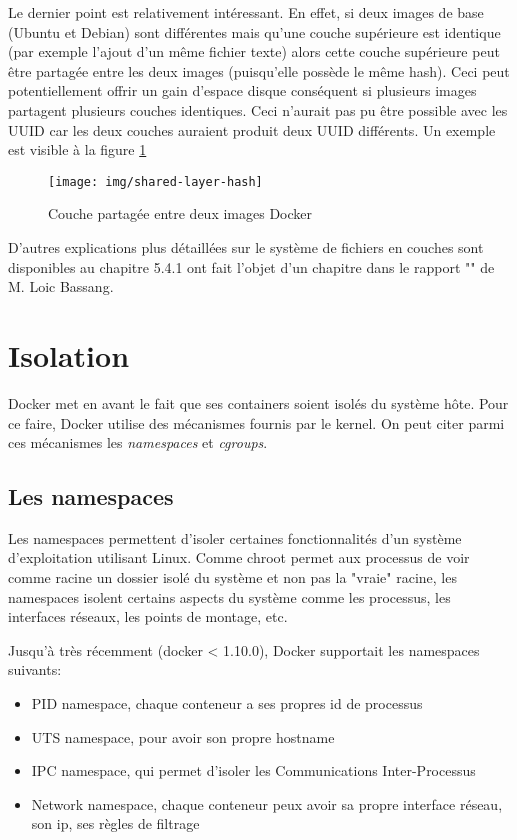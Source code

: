 Le dernier point est relativement intéressant. En effet, si deux images de base (Ubuntu et Debian) sont différentes mais qu'une couche supérieure est identique (par exemple l'ajout d'un même fichier texte) alors cette couche supérieure peut être partagée entre les deux images (puisqu'elle possède le même hash). Ceci peut potentiellement offrir un gain d'espace disque conséquent si plusieurs images partagent plusieurs couches identiques. Ceci n'aurait pas pu être possible avec les UUID car les deux couches auraient produit deux UUID différents. Un exemple est visible à la figure \ref{shared-layer-hash}

\begin{figure}[hbtp]
\centering
\texttt{[image: img/shared-layer-hash]}
\caption{Couche partagée entre deux images Docker}
\label{shared-layer-hash}
\end{figure}

D'autres explications plus détaillées sur le système de fichiers en couches sont disponibles au chapitre 5.4.1 ont fait l'objet d'un chapitre dans le rapport "\bassangPrjSemestre" de M. Loic Bassang.


\section{Isolation}\label{pres-docker-isolation}
Docker met en avant le fait que ses containers soient isolés du système hôte. Pour ce faire, Docker utilise des mécanismes fournis par le kernel. On peut citer parmi ces mécanismes les \textit{namespaces} et \textit{cgroups}.

\subsection{Les namespaces}
Les namespaces permettent d'isoler certaines fonctionnalités d'un système d'exploitation utilisant Linux. Comme chroot permet aux processus de voir comme racine un dossier isolé du système et non pas la "vraie" racine, les namespaces isolent certains aspects du système comme les processus, les interfaces réseaux, les points de montage, etc.

Jusqu'à très récemment (docker < 1.10.0), Docker supportait les namespaces suivants\cite{docker_1_10_user_namespace}:

\begin{itemize}
\item PID namespace, chaque conteneur a ses propres id de processus
\item UTS namespace, pour avoir son propre hostname
\item IPC namespace, qui permet d'isoler les Communications Inter-Processus
\item Network namespace, chaque conteneur peux avoir sa propre interface réseau, son ip, ses règles de filtrage
\end{itemize}

